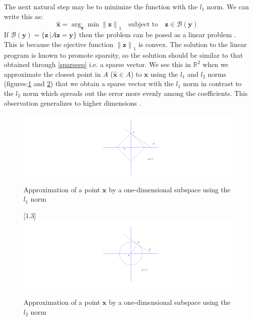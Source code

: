 \documentclass[11pt,twoside,a4paper]{article}
\begin{document}
The next natural step may be to minimize the function with the $l_1$ norm. We can write this as:
\begin{equation}
\hat{\mathbf{x}}={\arg}_{\mathbf{z}}\min{\lVert\mathbf{z}\rVert}_1 \quad \text{subject to} \quad \mathbf{z}\in \mathcal{B}(\mathbf{y})\label{lineareq}
\end{equation}
If $\mathcal{B}(\mathbf{y})=\{\mathbf{z} \,\vert A\mathbf{z}=\mathbf{y}\}$ then the problem can be posed as a linear problem \cite{GK}. This is because the ojective function ${\lVert\mathbf{z}\rVert}_1$ is convex. The solution to the linear program is known to promote sparsity, so the solution should be similar to that obtained through \eqref{sparseeq} i.e. a sparse vector. We see this in ${\mathbb{R}}^2$ when we approximate the closest point in $A$ ($\hat{\mathbf{x}}\in A$) to $\mathbf{x}$ using the $l_1$ and $l_2$ norms (figures:\ref{l1norm} and \ref{l2norm}) that we obtain a sparse vector with the $l_1$ norm in contrast to the $l_2$ norm which spreads out the error more evenly among the coefficients. This observation generalizes to higher dimensions \cite{GK}.
\begin{figure}[tb]
\centering
\includegraphics[trim=0 0 0 0,clip=true,width=1\linewidth,keepaspectratio]{./l1_norm.png}
\caption[Using the $l_1$ norm for approximation of a point in $\mathbb{R}^2$]{Approximation of a point $\mathbf{x}$ by a one-dimensional subspace using the $l_1$ norm}
\label{l1norm}
\end{figure}
\begin{figure}[htb]
\centering
\scalebox{1.3}[1.3]{\includegraphics[trim=200 0 0 0,clip=true,width=1\linewidth,keepaspectratio]{./l2_norm.png}}
\caption[Using the $l_2$ norm for approximation of a point in $\mathbb{R}^2$]{Approximation of a point $\mathbf{x}$ by a one-dimensional subspace using the $l_2$ norm}
\label{l2norm}
\end{figure}
\end{document}
